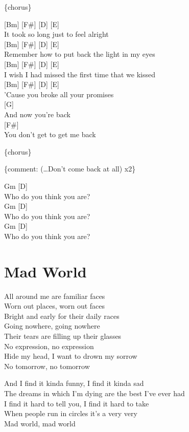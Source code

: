 \documentclass[
  letterpaper,
  DIV=11,
  numbers=noendperiod]{scrreprt}
\begin{document}
\{chorus\}

{[}Bm{]} {[}F\#{]} {[}D{]} {[}E{]}\\
It took so long just to feel alright\\
{[}Bm{]} {[}F\#{]} {[}D{]} {[}E{]}\\
Remember how to put back the light in my eyes\\
{[}Bm{]} {[}F\#{]} {[}D{]} {[}E{]}\\
I wish I had missed the first time that we kissed\\
{[}Bm{]} {[}F\#{]} {[}D{]} {[}E{]}\\
'Cause you broke all your promises\\
{[}G{]}\\
And now you're back\\
{[}F\#{]}\\
You don't get to get me back

\{chorus\}

\{comment: (\ldots Don't come back at all) x2\}

Gm {[}D{]}\\
Who do you think you are?\\
Gm {[}D{]}\\
Who do you think you are?\\
Gm {[}D{]}\\
Who do you think you are?

\hypertarget{mad-world}{%
\chapter{Mad World}\label{mad-world}}

All around me are familiar faces\\
Worn out places, worn out faces\\
Bright and early for their daily races\\
Going nowhere, going nowhere\\
Their tears are filling up their glasses\\
No expression, no expression\\
Hide my head, I want to drown my sorrow\\
No tomorrow, no tomorrow

And I find it kinda funny, I find it kinda sad\\
The dreams in which I'm dying are the best I've ever had\\
I find it hard to tell you, I find it hard to take\\
When people run in circles it's a very very\\
Mad world, mad world
\end{document}
